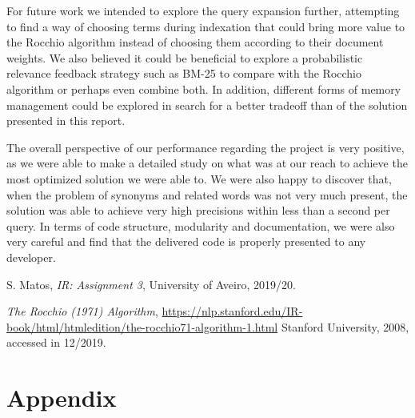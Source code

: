 \documentclass[12pt]{article}
\begin{document}
For future work we intended to explore the query expansion further, attempting
to find a way of choosing terms during indexation that could bring more value
to the Rocchio algorithm instead of choosing them according to their document 
weights.
We also believed it could be beneficial to explore a probabilistic relevance 
feedback strategy such as BM-25 to compare with the Rocchio algorithm
or perhaps even combine both.
In addition, different forms of memory management could be explored in search
for a better tradeoff than of the solution presented in this report.

The overall perspective of our performance regarding the project is very positive,
as we were able to make a detailed study on what was at our reach to achieve the 
most optimized solution we were able to.
We were also happy to discover that, when the problem of synonyms and related 
words was not very much present, the solution was able to achieve very high 
precisions within less than a second per query.
In terms of code structure, modularity and documentation, we were also very 
careful and find that the delivered code is properly presented to any developer.

\begin{thebibliography}{9}
  

    S. Matos,
    \textit{IR: Assignment 3},
    University of Aveiro,
    2019/20.

    \textit{The Rocchio (1971) Algorithm},
    \url{https://nlp.stanford.edu/IR-book/html/htmledition/the-rocchio71-algorithm-1.html}
    Stanford University,
    2008,
    accessed in 12/2019.
  
\end{thebibliography}

\appendix
\section*{Appendix}
\end{document}
